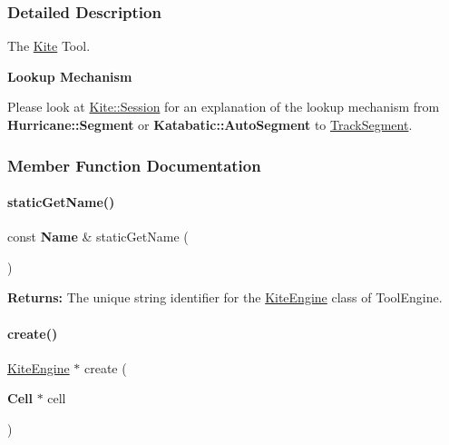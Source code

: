 \subsubsection{Detailed Description}
The \mbox{\hyperlink{namespaceKite}{Kite}} Tool. 

{\bfseries Lookup Mechanism}

Please look at \mbox{\hyperlink{classKite_1_1Session}{Kite\+::\+Session}} for an explanation of the lookup mechanism from \textbf{ Hurricane\+::\+Segment} or \textbf{ Katabatic\+::\+Auto\+Segment} to \mbox{\hyperlink{classKite_1_1TrackSegment}{Track\+Segment}}. 

\subsubsection{Member Function Documentation}
\mbox{\label{classKite_1_1KiteEngine_a802eee6265da8d536db52d412f8a4afd}} 
\paragraph{\texorpdfstring{static\+Get\+Name()}{staticGetName()}}
{\footnotesize\ttfamily const \textbf{ Name} \& static\+Get\+Name (\begin{DoxyParamCaption}{ }\end{DoxyParamCaption})\hspace{0.3cm}{\ttfamily [static]}}

{\bfseries Returns\+:} The unique string identifier for the \mbox{\hyperlink{classKite_1_1KiteEngine}{Kite\+Engine}} class of Tool\+Engine. \mbox{\label{classKite_1_1KiteEngine_a520d92a22c1becdc0fbbec927365db21}} 
\paragraph{\texorpdfstring{create()}{create()}}
{\footnotesize\ttfamily \mbox{\hyperlink{classKite_1_1KiteEngine}{Kite\+Engine}} $\ast$ create (\begin{DoxyParamCaption}\item[{\textbf{ Cell} $\ast$}]{cell }\end{DoxyParamCaption})\hspace{0.3cm}{\ttfamily [static]}}

